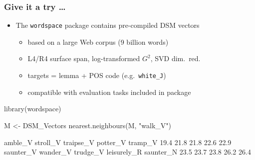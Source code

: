 \documentclass[t]{beamer} %
\begin{document}
\begin{frame}[fragile]
  \frametitle{Give it a try \ldots}
  
  \begin{itemize}
  \item The \texttt{wordspace} package contains pre-compiled DSM vectors
    \begin{itemize}
    \item based on a large Web corpus (9 billion words)
    \item L4/R4 surface span, log-transformed $G^2$, SVD dim.\ red.
    \item targets = lemma + POS code (e.g.\ \texttt{white\_J})
    \item compatible with evaluation tasks included in package
    \end{itemize}
  \end{itemize}

\begin{Rcode}
library(wordspace)

M <- DSM_Vectors
nearest.neighbours(M, "walk_V")\begin{Rout}
    amble_V    stroll_V   traipse_V    potter_V     tramp_V 
       19.4        21.8        21.8        22.6        22.9 
  saunter_V    wander_V    trudge_V leisurely_R   saunter_N 
       23.5        23.7        23.8        26.2        26.4\end{Rout}
\end{Rcode}
\end{frame}
\end{document}

